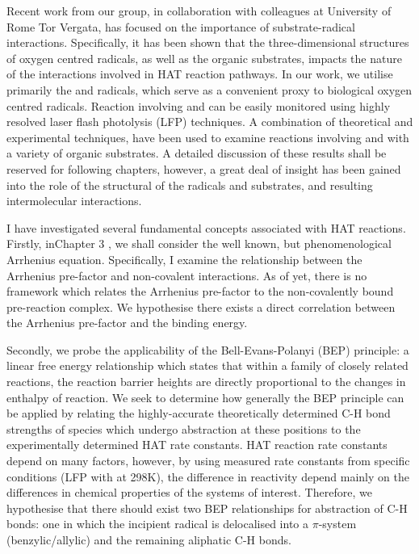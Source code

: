 Recent work from our group, in collaboration with colleagues at University of
Rome Tor Vergata, has focused on the importance of substrate-radical
interactions. Specifically, it has been shown that the three-dimensional
structures of oxygen centred radicals, as well as the organic substrates,
impacts the nature of the interactions involved in HAT reaction pathways. In our
work, we utilise primarily the \bno and \cumo radicals, which serve as a
convenient proxy to biological oxygen centred radicals. Reaction involving \bno
and \cumo can be easily monitored using highly resolved laser flash photolysis
(LFP) techniques. A combination of theoretical and experimental techniques, have
been used to examine reactions involving \bno and \cumo with a variety of
organic substrates. A detailed discussion of these results shall be reserved for
following chapters, however, a great deal of insight has been gained into the
role of the structural of the radicals and substrates, and resulting
intermolecular interactions.

I have investigated several fundamental concepts associated with HAT reactions.
Firstly, inChapter 3 , we shall
consider the well known, but phenomenological Arrhenius equation. Specifically,
I examine the relationship between the Arrhenius pre-factor and non-covalent
interactions. As of yet, there is no framework which relates the Arrhenius
pre-factor to the non-covalently bound pre-reaction complex. We hypothesise
there exists a direct correlation between the Arrhenius pre-factor and the
binding energy.

Secondly, we probe the applicability of the Bell-Evans-Polanyi (BEP) principle:
a linear free energy relationship which states that within a family of closely
related reactions, the reaction barrier heights are directly proportional to the
changes in enthalpy of reaction. We seek to determine how generally the BEP
principle can be applied by relating the highly-accurate theoretically
determined C-H bond strengths of species which undergo abstraction at these
positions to the experimentally determined HAT rate constants. HAT reaction rate
constants depend on many factors, however, by using measured rate constants from
specific conditions (LFP with \cumo at 298K), the difference in reactivity
depend mainly on the differences in chemical properties of the systems of
interest. Therefore, we hypothesise that there should exist two BEP
relationships for abstraction of C-H bonds: one in which the incipient radical
is delocalised into a $\pi$-system (benzylic/allylic) and the remaining
aliphatic C-H bonds.

